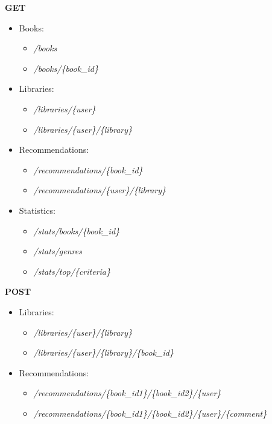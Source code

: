 \textbf{GET}
\begin{itemize}
    \item Books:
    \begin{itemize}
        \item \textit{/books}
        \item \textit{/books/\{book\_id\}}
    \end{itemize}
    \item Libraries:
    \begin{itemize}
        \item \textit{/libraries/\{user\}}
        \item \textit{/libraries/\{user\}/\{library\}}
    \end{itemize}
    \item Recommendations:
    \begin{itemize}
        \item \textit{/recommendations/\{book\_id\}}
        \item \textit{/recommendations/\{user\}/\{library\}}
    \end{itemize}
    \item Statistics:
    \begin{itemize}
        \item \textit{/stats/books/\{book\_id\}}
        \item \textit{/stats/genres}
        \item \textit{/stats/top/\{criteria\}}
    \end{itemize}
\end{itemize}

\textbf{POST}
\begin{itemize}
    \item Libraries:
    \begin{itemize}
        \item \textit{/libraries/\{user\}/\{library\}}
        \item \textit{/libraries/\{user\}/\{library\}/\{book\_id\}}
    \end{itemize}
    \item Recommendations:
    \begin{itemize}
        \item \textit{/recommendations/\{book\_id1\}/\{book\_id2\}/\{user\}}
        \item \textit{/recommendations/\{book\_id1\}/\{book\_id2\}/\{user\}/\{comment\}}
    \end{itemize}
\end{itemize}

